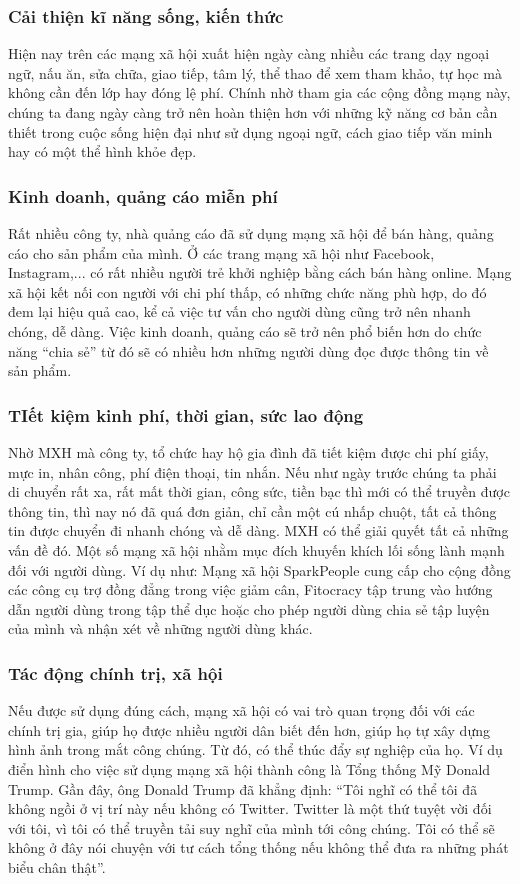 		\subsubsection{Cải thiện kĩ năng sống, kiến thức}
		Hiện nay trên các mạng xã hội xuất hiện ngày càng nhiều các trang dạy ngoại ngữ, nấu ăn, sửa chữa, giao tiếp, tâm lý, thể thao để xem tham khảo, tự học mà không cần đến lớp hay đóng lệ phí. Chính nhờ tham gia các cộng đồng mạng này, chúng ta đang ngày càng trở nên hoàn thiện hơn với những kỹ năng cơ bản cần thiết trong cuộc sống hiện đại như sử dụng ngoại ngữ, cách giao tiếp văn minh hay có một thể hình khỏe đẹp.
		\subsubsection{Kinh doanh, quảng cáo miễn phí}
		Rất nhiều công ty, nhà quảng cáo đã sử dụng mạng xã hội để bán hàng, quảng cáo cho sản phẩm của mình. Ở các trang mạng xã hội như Facebook, Instagram,... có rất nhiều người trẻ khởi nghiệp bằng cách bán hàng online. Mạng xã hội kết nối con người với chi phí thấp, có những chức năng phù hợp, do đó đem lại hiệu quả cao, kể cả việc tư vấn cho người dùng cũng trở nên nhanh chóng, dễ dàng. Việc kinh doanh, quảng cáo sẽ trở nên phổ biến hơn do chức năng “chia sẻ” từ đó sẽ có nhiều hơn những người dùng đọc được thông tin về sản phẩm.
		\subsubsection{TIết kiệm kinh phí, thời gian, sức lao động}
		Nhờ MXH mà công ty, tổ chức hay hộ gia đình đã tiết kiệm được chi phí giấy, mực in, nhân công, phí điện thoại, tin nhắn. Nếu như ngày trước chúng ta phải di chuyển rất xa, rất mất thời gian, công sức, tiền bạc thì mới có thể truyền được thông tin, thì nay nó đã quá đơn giản, chỉ cần một cú nhấp chuột, tất cả thông tin được chuyển đi nhanh chóng và dễ dàng. MXH có thể giải quyết tất cả những vấn đề đó. Một số mạng xã hội nhằm mục đích khuyến khích lối sống lành mạnh đối với người dùng. Ví dụ như: Mạng xã hội SparkPeople cung cấp cho cộng đồng các công cụ trợ đồng đẳng trong việc giảm cân, Fitocracy tập trung vào hướng dẫn người dùng trong tập thể dục hoặc cho phép người dùng chia sẻ tập luyện của mình và nhận xét về những người dùng khác.
		\subsubsection{Tác động chính trị, xã hội}
		Nếu được sử dụng đúng cách, mạng xã hội có vai trò quan trọng đối với các chính trị gia, giúp họ được nhiều người dân biết đến hơn, giúp họ tự xây dựng hình ảnh trong mắt công chúng. Từ đó, có thể thúc đẩy sự nghiệp của họ. Ví dụ điển hình cho việc sử dụng mạng xã hội thành công là Tổng thống Mỹ Donald Trump. Gần đây, ông Donald Trump đã khẳng định: “Tôi nghĩ có thể tôi đã không ngồi ở vị trí này nếu không có Twitter. Twitter là một thứ tuyệt vời đối với tôi, vì tôi có thể truyền tải suy nghĩ của mình tới công chúng. Tôi có thể sẽ không ở đây nói chuyện với tư cách tổng thống nếu không thể đưa ra những phát biểu chân thật”.
		
